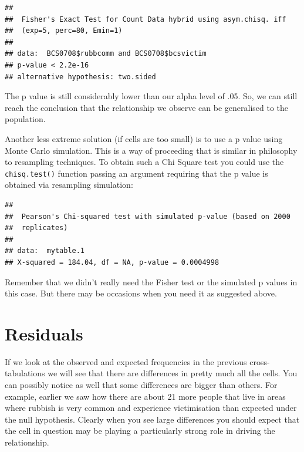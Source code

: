 \documentclass[
]{book}
\newenvironment{Shaded}{\begin{snugshade}}{\end{snugshade}}
\newcommand{\AttributeTok}[1]{\textcolor[rgb]{0.77,0.63,0.00}{#1}}
\newcommand{\ConstantTok}[1]{\textcolor[rgb]{0.00,0.00,0.00}{#1}}
\newcommand{\FloatTok}[1]{\textcolor[rgb]{0.00,0.00,0.81}{#1}}
\newcommand{\FunctionTok}[1]{\textcolor[rgb]{0.00,0.00,0.00}{#1}}
\newcommand{\NormalTok}[1]{#1}
\newcommand{\OtherTok}[1]{\textcolor[rgb]{0.56,0.35,0.01}{#1}}
\newcommand{\SpecialCharTok}[1]{\textcolor[rgb]{0.00,0.00,0.00}{#1}}
\begin{document}
\begin{verbatim}
## 
##  Fisher's Exact Test for Count Data hybrid using asym.chisq. iff
##  (exp=5, perc=80, Emin=1)
## 
## data:  BCS0708$rubbcomm and BCS0708$bcsvictim
## p-value < 2.2e-16
## alternative hypothesis: two.sided
\end{verbatim}

The p value is still considerably lower than our alpha level of .05. So, we can still reach the conclusion that the relationship we observe can be generalised to the population.

Another less extreme solution (if cells are too small) is to use a p value using Monte Carlo simulation. This is a way of proceeding that is similar in philosophy to resampling techniques. To obtain such a Chi Square test you could use the \texttt{chisq.test()} function passing an argument requiring that the p value is obtained via resampling simulation:

\begin{Shaded}
\end{Shaded}

\begin{verbatim}
## 
##  Pearson's Chi-squared test with simulated p-value (based on 2000
##  replicates)
## 
## data:  mytable.1
## X-squared = 184.04, df = NA, p-value = 0.0004998
\end{verbatim}

Remember that we didn't really need the Fisher test or the simulated p values in this case. But there may be occasions when you need it as suggested above.

\hypertarget{residuals}{%
\section{Residuals}\label{residuals}}

If we look at the observed and expected frequencies in the previous cross-tabulations we will see that there are differences in pretty much all the cells. You can possibly notice as well that some differences are bigger than others. For example, earlier we saw how there are about 21 more people that live in areas where rubbish is very common and experience victimisation than expected under the null hypothesis. Clearly when you see large differences you should expect that the cell in question may be playing a particularly strong role in driving the relationship.
\end{document}
